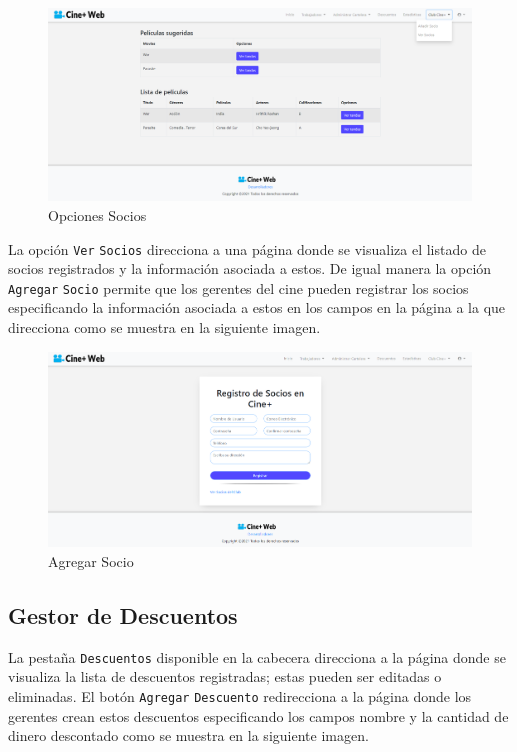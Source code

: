 \begin{figure}[h!]
	\centering
	\includegraphics[scale=0.35]{./chapters/img/option_partner.png}
	
	\label{fig:option_partner}
	\caption{Opciones Socios}
	
\end{figure}

La opci\'on \verb*|Ver| \verb*|Socios| direcciona a una p\'agina donde se visualiza el listado de socios registrados y la informaci\'on asociada a estos. De igual manera la opci\'on \verb*|Agregar| \verb*|Socio| permite que los gerentes del cine pueden registrar los socios especificando la informaci\'on asociada a estos en los campos en la p\'agina a la que direcciona como se muestra en la siguiente imagen.

\begin{figure}[h!]
	\centering
	\includegraphics[scale=0.35]{./chapters/img/add_partner.png}
	
	\label{fig:add_partner}
	\caption{Agregar Socio}
	
\end{figure}

\subsection{Gestor de Descuentos}
La pesta\~na \verb*|Descuentos| disponible en la cabecera direcciona a la p\'agina donde se visualiza la lista de descuentos registradas; estas pueden ser editadas o eliminadas. El bot\'on \verb*|Agregar| \verb*|Descuento| redirecciona a la p\'agina donde los gerentes crean estos descuentos especificando los campos nombre y la cantidad de dinero descontado como se muestra en la siguiente imagen.

